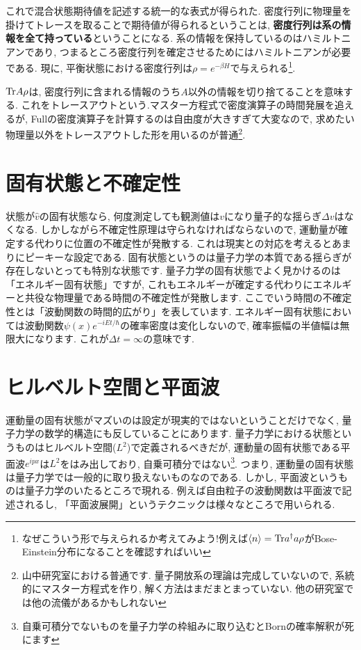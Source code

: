 \documentclass[10.5pt,a4paper]{jreport}
\begin{document}
これで混合状態期待値を記述する統一的な表式が得られた. 密度行列に物理量を掛けてトレースを取ることで期待値が得られるということは, {\bf 密度行列は系の情報を全て持っている}ということになる. 系の情報を保持しているのはハミルトニアンであり, つまるところ密度行列を確定させるためにはハミルトニアンが必要である. 現に, 平衡状態における密度行列は$\rho = e^{-\beta H}$で与えられる\footnote{なぜこういう形で与えられるか考えてみよう!例えば$\expval{n} = {\rm Tr}a^\dagger a\rho$がBose-Einstein分布になることを確認すればいい}.

${\rm Tr}A\rho$は, 密度行列に含まれる情報のうち$A$以外の情報を切り捨てることを意味する. これをトレースアウトという.マスター方程式で密度演算子の時間発展を追えるが, Fullの密度演算子を計算するのは自由度が大きすぎて大変なので, 求めたい物理量以外をトレースアウトした形を用いるのが普通\footnote{山中研究室における普通です. 量子開放系の理論は完成していないので, 系統的にマスター方程式を作り, 解く方法はまだまとまっていない. 他の研究室では他の流儀があるかもしれない}.
\section{固有状態と不確定性}
状態が$\hat{v}$の固有状態なら, 何度測定しても観測値は$v$になり量子的な揺らぎ$\Delta v$はなくなる. しかしながら不確定性原理は守られなければならないので, 運動量が確定する代わりに位置の不確定性が発散する. これは現実との対応を考えるとあまりにピーキーな設定である. 固有状態というのは量子力学の本質である揺らぎが存在しないとっても特別な状態です. 量子力学の固有状態でよく見かけるのは「エネルギー固有状態」ですが, これもエネルギーが確定する代わりにエネルギーと共役な物理量である時間の不確定性が発散します. ここでいう時間の不確定性とは「波動関数の時間的広がり」を表しています. エネルギー固有状態においては波動関数$\psi(x) e^{-iEt/\hbar}$の確率密度は変化しないので, 確率振幅の半値幅は無限大になります. これが$\Delta t = \infty$の意味です.
\section{ヒルベルト空間と平面波}
運動量の固有状態がマズいのは設定が現実的ではないということだけでなく, 量子力学の数学的構造にも反していることにあります. 量子力学における状態というものはヒルベルト空間($L^2$)で定義されるべきだが, 運動量の固有状態である平面波$e^{ipx}$は$L^2$をはみ出しており, 自乗可積分ではない\footnote{自乗可積分でないものを量子力学の枠組みに取り込むとBornの確率解釈が死にます}. つまり, 運動量の固有状態は量子力学では一般的に取り扱えないものなのである. しかし, 平面波というものは量子力学のいたるところで現れる. 例えば自由粒子の波動関数は平面波で記述されるし, 「平面波展開」というテクニックは様々なところで用いられる.
\end{document}
